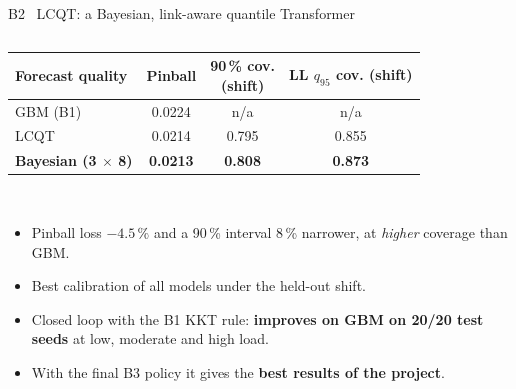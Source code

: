 \documentclass[aspectratio=169,10pt,xcolor={table,dvipsnames}]{beamer}
\newcommand{\gd}[1]{\textcolor{good}{\textbf{#1}}}
\newcommand{\ours}{\rowcolor{good!14}}
\begin{document}
\begin{frame}{B2 \textbullet\ LCQT: a Bayesian, link-aware quantile Transformer}
\begin{columns}[T]
\begin{column}{0.51\textwidth}
\footnotesize
\setlength{\tabcolsep}{3.5pt}
\begin{tabular}{lccc}
\toprule
Forecast quality & Pinball & \makecell{90\,\% cov.\\(shift)} & \makecell{LL $q_{95}$ cov.\\(shift)} \\
\midrule
GBM (B1) & 0.0224 & n/a & n/a \\
LCQT & 0.0214 & 0.795 & 0.855 \\
\ours \textbf{Bayesian (3 $\times$ 8)} & \textbf{0.0213} & \textbf{0.808} & \textbf{0.873} \\
\bottomrule
\end{tabular}\\[5pt]
\begin{itemize}
  \item Pinball loss $-4.5\,\%$ and a 90\,\% interval 8\,\% narrower, at \emph{higher} coverage than GBM.
  \item Best calibration of all models under the held-out shift.
  \item Closed loop with the B1 KKT rule: \gd{improves on GBM on 20/20 test seeds} at low, moderate and high load.
  \item With the final B3 policy it gives the \textbf{best results of the project}.
\end{itemize}
\end{column}
\end{columns}
\end{frame}
\end{document}
